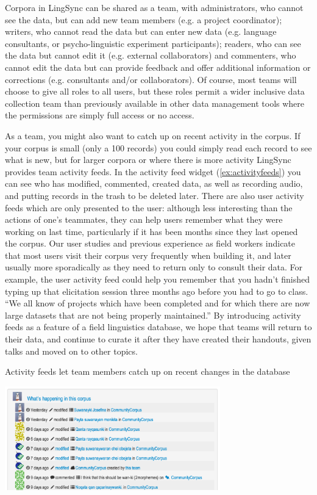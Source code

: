 \documentclass[letterpaper, 12pt, dvips]{mitwpl}
\begin{document}
Corpora in LingSync can be shared as a team,
with administrators,
who cannot see the data,
but can add new team members (e.g.
a project coordinator); writers,
who cannot read the data but can enter new data (e.g.
language consultants,
or psycho-linguistic experiment participants); readers,
who can see the data but cannot edit it (e.g.
external collaborators) and commenters,
 who cannot edit the data but can provide feedback and offer additional information or corrections (e.g.
consultants and/or collaborators).
 Of course,
most teams will choose to give all roles to all users,
but these roles permit a wider inclusive data collection team than previously available  in other data management tools where the permissions are simply full access or no access.

As a team,
you might also want to catch up on recent activity in the corpus.
If your corpus is small (only a 100 records) you could simply read each record to see what is new,
but for larger corpora or where there is more activity LingSync provides team activity feeds.
In the activity feed widget (\ref{ex:activityfeeds}) you can see who has modified,
commented,
created data,
as well as recording audio,
and putting records in the trash to be deleted later.
There are also user activity feeds which are only presented to the user: although less interesting than the actions of one's teammates,
they can help users remember what they were working on last time,
particularly if it has been months since they last opened the corpus.
Our user studies and previous experience as field workers indicate that most users visit their corpus very frequently
when building it,
and later usually more sporadically as they need to return only to consult their data.
For example,
the user activity feed could help you remember that you hadn't finished typing up that elicitation session three months ago before you had to go to class.
``We all know of projects which have been completed and for which there are now large datasets that are not being properly maintained.''\citep[p.133]{Thieberger:2012} By introducing activity feeds as a feature of a field linguistics database, we hope that teams will return to their data, and continue to curate it after they have created their handouts, given talks and moved on to other topics. 

\begin{exe} 
\ex Activity feeds let team members catch up on recent changes in the database

 \centering
   \includegraphics[width=0.7\textwidth]{activityfeeds} 

\label{ex:activityfeeds}
\end{exe}
\end{document}
